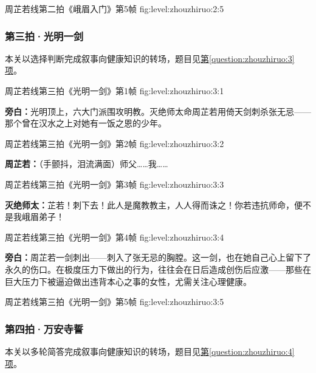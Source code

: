 \clearpage

  {周芷若线第二拍《峨眉入门》第5帧}
  {fig:level:zhouzhiruo:2:5}
  {\scriptsize}
  {\mbox{}}

\subsubsection{第三拍·光明一剑}\label{plot:zhouzhiruo:3}
本关以选择判断完成叙事向健康知识的转场，题目见\hyperref[question:zhouzhiruo:3]{第\ref*{question:zhouzhiruo:3}项}。

  {周芷若线第三拍《光明一剑》第1帧}
  {fig:level:zhouzhiruo:3:1}
  {\scriptsize}
  {\textbf{旁白：}光明顶上，六大门派围攻明教。灭绝师太命周芷若用倚天剑刺杀张无忌——那个曾在汉水之上对她有一饭之恩的少年。\par}

  {周芷若线第三拍《光明一剑》第2帧}
  {fig:level:zhouzhiruo:3:2}
  {\scriptsize}
  {\textbf{周芷若：}（手颤抖，泪流满面）师父……我……\par}

\clearpage

  {周芷若线第三拍《光明一剑》第3帧}
  {fig:level:zhouzhiruo:3:3}
  {\scriptsize}
  {\textbf{灭绝师太：}芷若！刺下去！此人是魔教教主，人人得而诛之！你若违抗师命，便不是我峨眉弟子！\par}

  {周芷若线第三拍《光明一剑》第4帧}
  {fig:level:zhouzhiruo:3:4}
  {\scriptsize}
  {\textbf{旁白：}周芷若一剑刺出——刺入了张无忌的胸膛。这一剑，也在她自己心上留下了永久的伤口。在极度压力下做出的行为，往往会在日后造成创伤后应激——那些在巨大压力下被逼迫做出违背本心之事的女性，尤需关注心理健康。\par}

  {周芷若线第三拍《光明一剑》第5帧}
  {fig:level:zhouzhiruo:3:5}
  {\scriptsize}
  {\mbox{}}

\clearpage

\subsubsection{第四拍·万安寺誓}\label{plot:zhouzhiruo:4}
本关以多轮简答完成叙事向健康知识的转场，题目见\hyperref[question:zhouzhiruo:4]{第\ref*{question:zhouzhiruo:4}项}。

